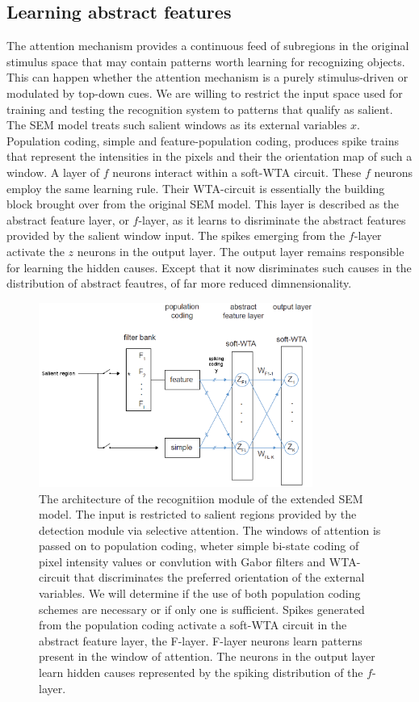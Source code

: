 \documentclass{report}
\begin{document}
\subsection{Learning abstract features}

The attention mechanism provides a continuous feed of subregions in the original stimulus space that may contain patterns worth learning for recognizing objects. This can happen whether the attention mechanism is a purely stimulus-driven or modulated by top-down cues. We are willing to restrict the input space used for training and testing the recognition system to patterns that qualify as salient. The SEM model treats such salient windows as its external variables $x$. Population coding, simple and feature-population coding, produces spike trains that represent the intensities in the pixels and their the orientation map of such a window. A layer of $f$ neurons interact within a soft-WTA circuit. These $f$ neurons employ the same learning rule. Their WTA-circuit is essentially the building block brought over from the original SEM model. This layer is described as the abstract feature layer, or $f$-layer, as it learns to disriminate the abstract features provided by the salient window input. The spikes emerging from the $f$-layer activate the $z$ neurons in the output layer. The output layer remains responsible for learning the hidden causes. Except that it now disriminates such causes in the distribution of abstract feautres, of far more reduced dimnensionality.

\begin{figure}[ht]
\centering
\includegraphics[width=0.8\textwidth]{architecture_recognition}
\caption{The architecture of the recognitiion module of the extended SEM model. The input is restricted to salient regions provided by the detection module via selective attention. The windows of attention is passed on to population coding, wheter simple bi-state coding of pixel intensity values or convlution with Gabor filters and WTA-circuit that discriminates the preferred orientation of the external variables. We will determine if the use of both population coding schemes are necessary or if only one is sufficient. Spikes generated from the population coding activate a soft-WTA circuit in the abstract feature layer, the F-layer. F-layer neurons learn patterns present in the window of attention. The neurons in the output layer learn hidden causes represented by the spiking distribution of the $f$-layer. 
\label{fig:architecture_recognition}}
\end{figure}
\end{document}
